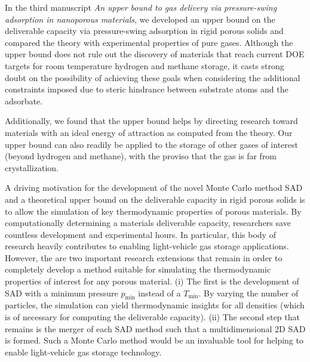 In the third manuscript \emph{An upper bound to gas delivery via pressure-swing
adsorption in nanoporous materials}, we developed an upper bound on the
deliverable capacity via pressure-swing adsorption in rigid porous solids and
compared the theory with experimental properties of pure gases. Although the
upper bound does not rule out the discovery of materials that reach current DOE
targets for room temperature hydrogen and methane storage, it casts strong
doubt on the possibility of achieving these goals when considering the
additional constraints imposed due to steric hindrance between substrate atoms
and the adsorbate.

Additionally, we found that the upper bound helps by directing research toward
materials with an ideal energy of attraction as computed from the theory. Our
upper bound can also readily be applied to the storage of other gases of
interest (beyond hydrogen and methane), with the proviso that the gas is far
from crystallization.

A driving motivation for the development of the novel Monte Carlo method SAD
and a theoretical upper bound on the deliverable capacity in rigid porous
solids is to allow the simulation of key thermodynamic properties of porous
materials. By computationally determining a materials deliverable capacity,
researchers save countless development and experimental hours. In particular,
this body of research heavily contributes to enabling light-vehicle gas storage
applications. However, the are two important research extensions that remain in
order to completely develop a method suitable for simulating the thermodynamic
properties of interest for any porous material. (i) The first is the
development of SAD with a minimum pressure $p_{\min}$ instead of a $T_{\min}$.
By varying the number of particles, the simulation can yield thermodynamic
insights for all densities (which is of necessary for computing the deliverable
capacity). (ii) The second step that remains is the merger of each SAD method
such that a multidimensional 2D SAD is formed. Such a Monte Carlo method would
be an invaluable tool for helping to enable light-vehicle gas storage
technology.